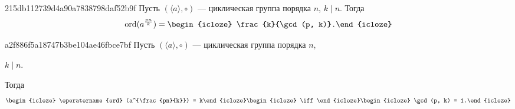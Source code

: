 \begin{note}{215db112739d4a90a7838798daf52b9f}
    Пусть \({ (\langle a \rangle, \circ) }\) --- циклическая группа порядка \({ n }\),\: \({ k \mid n }\).
    Тогда
    \[
        \operatorname{ord}(a^{\frac{pn}{k}}) = \begin{icloze}{1}\frac{k}{\gcd(p, k)}.\end{icloze}
    \]
\end{note}

\begin{note}{a2f886f5a18747b3be104ae46fbce7bf}
    Пусть \({ (\langle a \rangle, \circ) }\) --- циклическая группа порядка \({ n }\),\: \begin{icloze}{4}\({ k \mid n }\).\end{icloze}
    Тогда
    \[
        \begin{icloze}{3}\operatorname{ord} (a^{\frac{pn}{k}}) = k\end{icloze} \begin{icloze}{2}\iff\end{icloze} \begin{icloze}{1}\gcd(p, k) = 1.\end{icloze}
    \]
\end{note}



